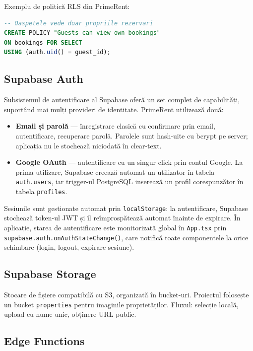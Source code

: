 \documentclass[12pt,a4paper,oneside]{report}
\begin{document}
Exemplu de politică RLS din PrimeRent:

\begin{lstlisting}[language=SQL, caption={Exemplu politică RLS pentru tabela bookings}]
-- Oaspetele vede doar propriile rezervari
CREATE POLICY "Guests can view own bookings"
ON bookings FOR SELECT
USING (auth.uid() = guest_id);
\end{lstlisting}

\subsection{Supabase Auth}

Subsistemul de autentificare al Supabase oferă un set complet de capabilități, suportând mai mulți provideri de identitate. PrimeRent utilizează două:

\begin{itemize}
  \item \textbf{Email și parolă} — înregistrare clasică cu confirmare prin email, autentificare, recuperare parolă. Parolele sunt hash-uite cu bcrypt pe server; aplicația nu le stochează niciodată în clear-text.
  \item \textbf{Google OAuth} — autentificare cu un singur click prin contul Google. La prima utilizare, Supabase creează automat un utilizator în tabela \texttt{auth.users}, iar trigger-ul PostgreSQL inserează un profil corespunzător în tabela \texttt{profiles}.
\end{itemize}

Sesiunile sunt gestionate automat prin \texttt{localStorage}: la autentificare, Supabase stochează token-ul JWT și îl reîmprospătează automat înainte de expirare. În aplicație, starea de autentificare este monitorizată global în \texttt{App.tsx} prin \texttt{supabase.auth.onAuthStateChange()}, care notifică toate componentele la orice schimbare (login, logout, expirare sesiune).

\subsection{Supabase Storage}

Stocare de fișiere compatibilă cu S3, organizată în bucket-uri. Proiectul folosește un bucket \texttt{properties} pentru imaginile proprietăților. Fluxul: selecție locală, upload cu nume unic, obținere URL public.

\subsection{Edge Functions}
\end{document}
